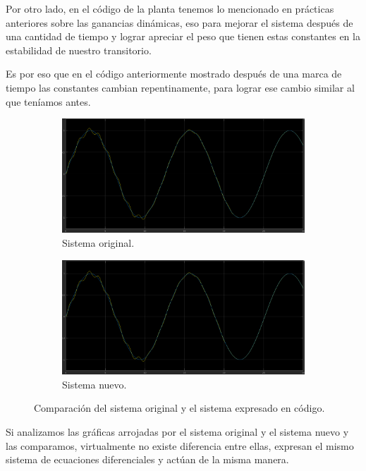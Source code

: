 \documentclass[12pt, letterpaper]{article}
\begin{document}
Por otro lado, en el código de la planta tenemos lo mencionado en prácticas anteriores sobre las ganancias dinámicas, eso para mejorar el sistema después de una cantidad de tiempo y lograr apreciar el peso que tienen estas constantes en la estabilidad de nuestro transitorio.

Es por eso que en el código anteriormente mostrado después de una marca de tiempo las constantes cambian repentinamente, para lograr ese cambio similar al que teníamos antes.

\begin{figure}[H]
	\centering
	\begin{subfigure}[b]{0.49\linewidth}
		\includegraphics[width=\linewidth]{oldsys.png}
		\caption{Sistema original.}
	\end{subfigure}
	\begin{subfigure}[b]{0.49\linewidth}
		\includegraphics[width=\linewidth]{newsys.png}
		\caption{Sistema nuevo.}
	\end{subfigure}
	\caption{Comparación del sistema original y el sistema expresado en código.}
\end{figure}

Si analizamos las gráficas arrojadas por el sistema original y el sistema nuevo y las comparamos, virtualmente no existe diferencia entre ellas, expresan el mismo sistema de ecuaciones diferenciales y actúan de la misma manera.
\end{document}
